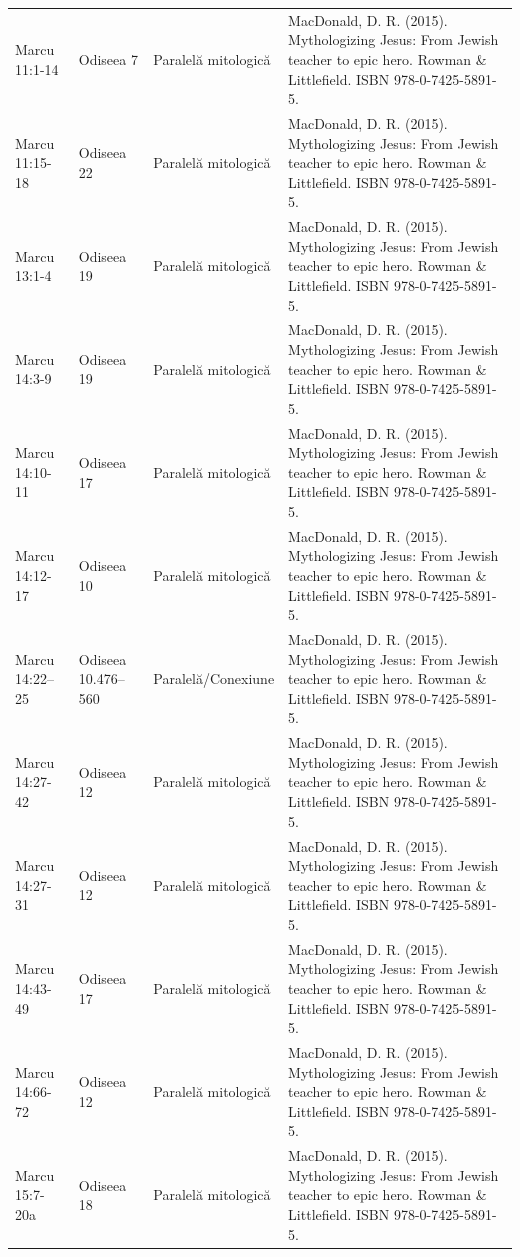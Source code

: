 \documentclass[12pt,a4paper,twoside,openany]{book}
\begin{document}
\begin{longtable}{L{1.4cm}L{1.7cm}L{3.1cm}L{8.4cm}}
Marcu 11:1-14 & Odiseea 7 & Paralelă mitologică & MacDonald, D. R. (2015). Mythologizing Jesus: From Jewish teacher to epic hero. Rowman \& Littlefield. ISBN 978-0-7425-5891-5. \\
Marcu 11:15-18 & Odiseea 22 & Paralelă mitologică & MacDonald, D. R. (2015). Mythologizing Jesus: From Jewish teacher to epic hero. Rowman \& Littlefield. ISBN 978-0-7425-5891-5. \\
Marcu 13:1-4 & Odiseea 19 & Paralelă mitologică & MacDonald, D. R. (2015). Mythologizing Jesus: From Jewish teacher to epic hero. Rowman \& Littlefield. ISBN 978-0-7425-5891-5. \\
Marcu 14:3-9 & Odiseea 19 & Paralelă mitologică & MacDonald, D. R. (2015). Mythologizing Jesus: From Jewish teacher to epic hero. Rowman \& Littlefield. ISBN 978-0-7425-5891-5. \\
Marcu 14:10-11 & Odiseea 17 & Paralelă mitologică & MacDonald, D. R. (2015). Mythologizing Jesus: From Jewish teacher to epic hero. Rowman \& Littlefield. ISBN 978-0-7425-5891-5. \\
Marcu 14:12-17 & Odiseea 10 & Paralelă mitologică & MacDonald, D. R. (2015). Mythologizing Jesus: From Jewish teacher to epic hero. Rowman \& Littlefield. ISBN 978-0-7425-5891-5. \\
Marcu 14:22–25 & Odiseea 10.476–560 & Paralelă/Conexiune & MacDonald, D. R. (2015). Mythologizing Jesus: From Jewish teacher to epic hero. Rowman \& Littlefield. ISBN 978-0-7425-5891-5. \\
Marcu 14:27-42 & Odiseea 12 & Paralelă mitologică & MacDonald, D. R. (2015). Mythologizing Jesus: From Jewish teacher to epic hero. Rowman \& Littlefield. ISBN 978-0-7425-5891-5. \\
Marcu 14:27-31 & Odiseea 12 & Paralelă mitologică & MacDonald, D. R. (2015). Mythologizing Jesus: From Jewish teacher to epic hero. Rowman \& Littlefield. ISBN 978-0-7425-5891-5. \\
Marcu 14:43-49 & Odiseea 17 & Paralelă mitologică & MacDonald, D. R. (2015). Mythologizing Jesus: From Jewish teacher to epic hero. Rowman \& Littlefield. ISBN 978-0-7425-5891-5. \\
Marcu 14:66-72 & Odiseea 12 & Paralelă mitologică & MacDonald, D. R. (2015). Mythologizing Jesus: From Jewish teacher to epic hero. Rowman \& Littlefield. ISBN 978-0-7425-5891-5. \\
Marcu 15:7-20a & Odiseea 18 & Paralelă mitologică & MacDonald, D. R. (2015). Mythologizing Jesus: From Jewish teacher to epic hero. Rowman \& Littlefield. ISBN 978-0-7425-5891-5. \\

\end{longtable}
\end{document}
